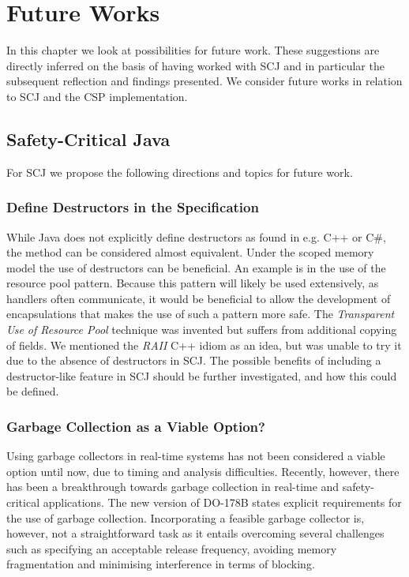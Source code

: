 \chapter{Future Works}
\label{chapter:FutureWorks}
In this chapter we look at possibilities for future work. These suggestions are directly inferred on the basis of having worked with SCJ and in particular the subsequent reflection and findings presented. We consider future works in relation to SCJ and the CSP implementation.

\section{Safety-Critical Java} %
\label{sec:scjfuture}
For SCJ we propose the following directions and topics for future work.

\subsection{Define Destructors in the Specification}
While Java does not explicitly define destructors as found in e.g. C++ or C\#, the  method can be considered almost equivalent. Under the scoped memory model the use of destructors can be beneficial. An example is in the use of the resource pool pattern. Because this pattern will likely be used extensively, as handlers often communicate, it would be beneficial to allow the development of encapsulations that makes the use of such a pattern more safe. The \textit{Transparent Use of Resource Pool} technique was invented but suffers from additional copying of fields. We mentioned the \textit{RAII} C++ idiom as an idea, but was unable to try it due to the absence of destructors in SCJ. The possible benefits of including a destructor-like feature in SCJ should be further investigated, and how this could be defined.

\subsection{Garbage Collection as a Viable Option?} %
\label{sub:garbage_collection_as_a_viable_option}
Using garbage collectors in real-time systems has not been considered a viable option until now, due to timing and analysis difficulties. Recently, however, there has been a breakthrough towards garbage collection in real-time and safety-critical applications. The new version of DO-178B states explicit requirements for the use of garbage collection. Incorporating a feasible garbage collector is, however, not a straightforward task as it entails overcoming several challenges such as specifying an acceptable release frequency, avoiding memory fragmentation and minimising interference in terms of blocking.

